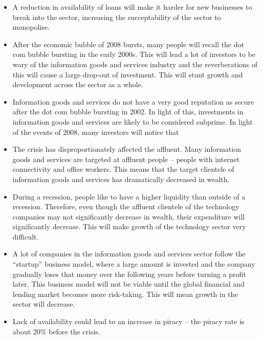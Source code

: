 \documentclass[10pt, a4paper]{article}
\begin{document}
\begin{itemize}

\item A reduction in availability of loans will make it harder for new
businesses to break into the sector, increasing the succeptability of the
sector to monopolise.

\item After the economic bubble of 2008 bursts, many people will recall the
dot com bubble bursting in the early 2000s. This will lead a lot of
investors to be wary of the information goods and services industry and the
reverberations of this will cause a large drop-out of investment. This will
stunt growth and development across the sector as a whole.

\item Information goods and services do not have a very good reputation as
secure after the dot com bubble bursting in 2002. In light of this,
investments in information goods and services are likely to be considered
subprime. In light of the events of 2008, many investors will notice that

\item The crisis has disproportionately affected the affluent. Many
information goods and services are targeted at affluent people -- people
with internet connectivity and office workers. This means that the target
clientele of information goods and services has dramatically decreased in
wealth.

\item During a recession, people like to have a higher liquidity than
outside of a recession. Therefore, even though the affluent clientele of
the technology companies may not significantly decrease in wealth, their
expenditure will significantly decrease. This will make growth of the
technology sector very difficult.

\item A lot of companies in the information goods and services sector follow
the ``startup'' business model, where a large amount is invested and the
company gradually loses that money over the following years before turning a
profit later. This business model will not be viable until the global
financial and lending market becomes more risk-taking. This will mean growth
in the sector will decrease.

\item Lack of availability could lead to an increase in piracy -- the piracy
rate is about 20\% before the crisis.

\end{itemize}
\end{document}
